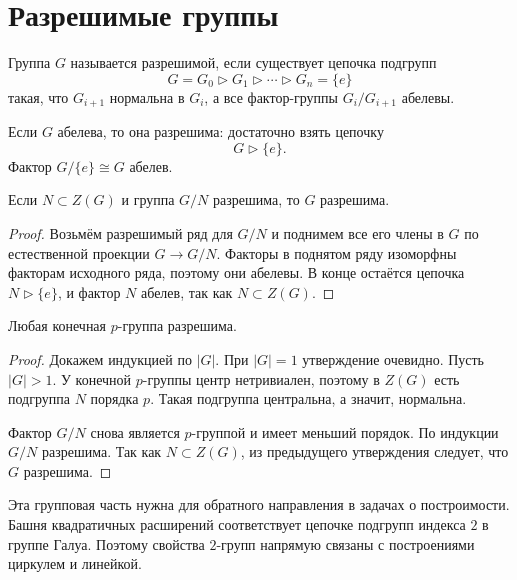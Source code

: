 \section{Разрешимые группы}

\begin{definition}
    Группа $G$ называется разрешимой, если существует цепочка подгрупп
    \[
        G=G_0 \triangleright G_1 \triangleright \cdots \triangleright G_n=\{e\}
    \]
    такая, что $G_{i+1}$ нормальна в $G_i$, а все фактор-группы $G_i/G_{i+1}$ абелевы.
\end{definition}

\begin{example}
    Если $G$ абелева, то она разрешима: достаточно взять цепочку
    \[
        G\triangleright \{e\}.
    \]
    Фактор $G/\{e\}\cong G$ абелев.
\end{example}

\begin{stmt}
    Если $N\subset Z(G)$ и группа $G/N$ разрешима, то $G$ разрешима.

    \begin{proof}
        Возьмём разрешимый ряд для $G/N$ и поднимем все его члены в $G$ по естественной проекции $G\to G/N$.
        Факторы в поднятом ряду изоморфны факторам исходного ряда, поэтому они абелевы. В конце остаётся цепочка
        $N\triangleright\{e\}$, и фактор $N$ абелев, так как $N\subset Z(G)$.
    \end{proof}
\end{stmt}

\begin{stmt}
    Любая конечная $p$-группа разрешима.

    \begin{proof}
        Докажем индукцией по $|G|$. При $|G|=1$ утверждение очевидно. Пусть $|G|>1$. У конечной $p$-группы центр нетривиален,
        поэтому в $Z(G)$ есть подгруппа $N$ порядка $p$. Такая подгруппа центральна, а значит, нормальна.

        Фактор $G/N$ снова является $p$-группой и имеет меньший порядок. По индукции $G/N$ разрешима.
        Так как $N\subset Z(G)$, из предыдущего утверждения следует, что $G$ разрешима.
    \end{proof}
\end{stmt}

\begin{remark}
    Эта групповая часть нужна для обратного направления в задачах о построимости. Башня квадратичных расширений соответствует цепочке подгрупп индекса
    $2$ в группе Галуа. Поэтому свойства $2$-групп напрямую связаны с построениями циркулем и линейкой.
\end{remark}

